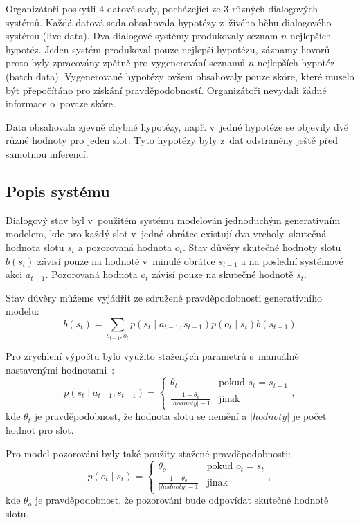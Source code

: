 Organizátoři poskytli 4 datové sady, pocházející ze 3 různých dialogových systémů.
Každá datová sada obsahovala hypotézy z~živého běhu dialogového systému (live data).
Dva dialogové systémy produkovaly seznam $n$ nejlepších hypotéz.
Jeden systém produkoval pouze nejlepší hypotézu, záznamy hovorů proto byly zpracovány zpětně pro vygenerování seznamů $n$ nejlepších hypotéz (batch data).
Vygenerované hypotézy ovšem obsahovaly pouze skóre, které muselo být přepočítáno pro získání pravděpodobností.
Organizátoři nevydali žádné informace o~povaze skóre.

Data obsahovala zjevně chybné hypotézy, např. v~jedné hypotéze se objevily dvě různé hodnoty pro jeden slot.
Tyto hypotézy byly z~dat odstraněny ještě před samotnou inferencí.

\subsection{Popis systému}

Dialogový stav byl v~použitém systému modelován jednoduchým generativním modelem, kde pro každý slot v~jedné obrátce existují dva vrcholy, skutečná hodnota slotu $s_t$ a pozorovaná hodnota $o_t$.
Stav důvěry skutečné hodnoty slotu $b(s_t)$ závisí pouze na hodnotě v~minulé obrátce $s_{t-1}$ a na poslední systémové akci $a_{t-1}$.
Pozorovaná hodnota $o_t$ závisí pouze na skutečné hodnotě $s_t$.

Stav důvěry můžeme vyjádřit ze sdružené pravděpodobnosti generativního modelu:
\begin{equation}
b(s_t) = \sum_{s_{t-1}, o_t} p(s_t \mid a_{t-1}, s_{t-1}) p(o_t \mid s_t) b(s_{t-1})
\end{equation}

Pro zrychlení výpočtu bylo využito stažených parametrů s~manuálně nastavenými hodnotami~\cite{thomson2010bayesian}:
\begin{equation}
p(s_t \mid a_{t-1}, s_{t-1}) = \begin{cases}
\theta_t & \text{pokud } s_t = s_{t-1} \\
\frac{1 - \theta_t}{|hodnoty| - 1} & \text{jinak}
\end{cases},
\end{equation}
kde $\theta_t$ je pravděpodobnost, že hodnota slotu se nemění a $|hodnoty|$ je počet hodnot pro slot.

Pro model pozorování byly také použity stažené pravděpodobnosti:
\begin{equation}
p(o_t \mid s_t) = \begin{cases}
\theta_o & \text{pokud } o_t = s_t \\
\frac{1 - \theta_o}{|hodnoty| - 1} & \text{jinak}
\end{cases},
\end{equation}
kde $\theta_o$ je pravděpodobnost, že pozorování bude odpovídat skutečné hodnotě slotu.

